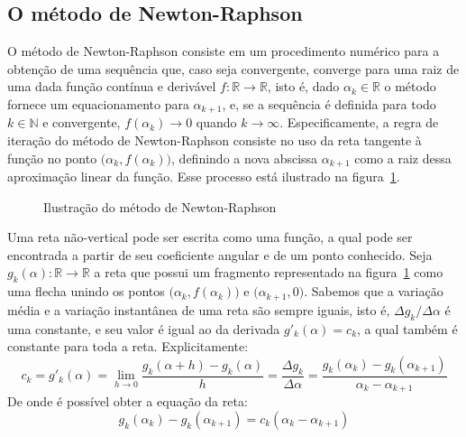 \subsection*{O método de Newton-Raphson}

O método de Newton-Raphson consiste em um procedimento numérico
para a obtenção de uma sequência que, caso seja convergente,
converge para uma raiz de uma dada função contínua e derivável
$f:\mathds{R}\to\mathds{R}$, isto é,
dado $\alpha_k \in \mathds{R}$ o método fornece
um equacionamento para $\alpha_{k+1}$,
e, se a sequência é definida para todo $k \in \mathds{N}$ e convergente,
$f(\alpha_k) \to 0$ quando $k \to \infty$.
Especificamente,
a regra de iteração do método de Newton-Raphson
consiste no uso da reta tangente à função
no ponto $\big(\alpha_k, f(\alpha_k)\big)$,
definindo a nova abscissa $\alpha_{k+1}$
como a raiz dessa aproximação linear da função.
Esse processo está ilustrado na figura~\ref{fig:newton-raphson}.

\begin{figure}[h!]
  \centering
  
  \caption{Ilustração do método de Newton-Raphson}
  \label{fig:newton-raphson}
\end{figure}

Uma reta não-vertical pode ser escrita como uma função,
a qual pode ser encontrada
a partir de seu coeficiente angular e de um ponto conhecido.
Seja $g_k(\alpha):\mathds{R}\to\mathds{R}$ a reta
que possui um fragmento representado na figura~\ref{fig:newton-raphson}
como uma flecha unindo os pontos
$\big(\alpha_k, f(\alpha_k)\big)$ e $\big(\alpha_{k+1}, 0\big)$.
Sabemos que a variação média e a variação instantânea de uma reta
são sempre iguais, isto é,
$\Delta g_k / \Delta \alpha$ é uma constante,
e seu valor é igual ao da derivada $g'_k(\alpha) = c_k$,
a qual também é constante para toda a reta.
Explicitamente:
\[
  c_k = g'_k(\alpha)
  =
    \lim_{h \to 0}
      \dfrac{g_k(\alpha + h) - g_k(\alpha)}{h}
  =
    \dfrac{\Delta g_k}{\Delta \alpha}
  =
    \dfrac{g_k(\alpha_k) - g_k(\alpha_{k+1})}{\alpha_k - \alpha_{k+1}}
\]
De onde é possível obter a equação da reta:
\begin{equation}
  g_k(\alpha_k) - g_k(\alpha_{k+1}) =
  c_k(\alpha_k - \alpha_{k+1})
\end{equation}

